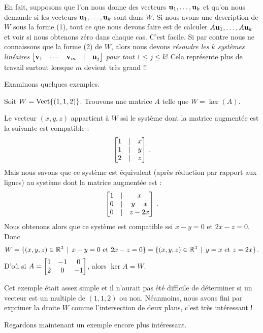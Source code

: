 En fait, supposons que l'on nous donne des vecteurs $ \uu_1,\dots,\uu_k $ et qu'on nous demande si les vecteurs $\uu_1,\dots,\uu_k$ sont dans $W$. Si nous avons une description de $W$ sous la forme (1), tout ce que nous devons faire est de calculer $A\uu_1, \dots, A\uu_k$ et voir si nous obtenons zéro dans chaque cas. C'est facile. Si par contre nous ne connaissons que la forme (2) de $W$, alors nous devons {\it résoudre les  $k$ systèmes linéaires $\mat{\vv_1&\cdots&  \vv_m &|& \uu_j}$  pour tout $1\le j\le k$}! Cela représente plus de travail surtout lorsque $m$ devient très grand !\!!


Examinons quelques exemples.

\begin{myexample}
Soit $W=\sp{(1,1,2)}$. Trouvons une matrice $A$ telle que $W=\ker (A)$.

Le vecteur $(x,y,z)$ appartient à $W$ ssi le système dont la matrice augmentée est la suivante est compatible :
$$\mat{1&|&x\\ 1&|&y\\ 2&|&z}\,.$$ 
Mais nous savons que ce système est équivalent (après réduction par rapport aux lignes) au système dont la matrice augmentée est :  $$\mat{1&|&x\\0&|&y-x\\0&|&z-2x}\,.$$
Nous obtenons alors que ce système est compatible ssi $x-y=0$ et $2x-z=0$. Donc
$$W=\set{(x,y,z) \in \R^3 \st x-y=0\text{ et }2x-z=0 } = \set{(x,y,z) \in \R^3 \st y=x\text{ et }z=2x }\,.$$ 
D'o\`u si $A=\mat{1&-1&0\\2&0&-1}$, alors $\ker A= W$.
\end{myexample}

Cet exemple était assez simple et il n'aurait pas été difficile de déterminer si un vecteur est un multiple de $(1,1,2)$ ou non. Néanmoins, nous avons fini par exprimer la droite $W$ comme l'intersection de deux plans, c'est très intéressant ! 

Regardons maintenant un exemple encore plus intéressant. 

